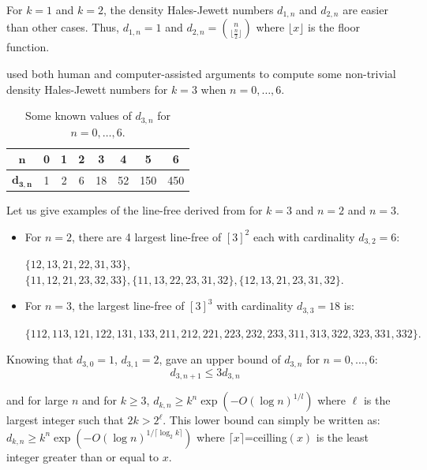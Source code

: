 For $k=1$ and $k=2$, the density Hales-Jewett numbers $d_{1,n}$ and $d_{2,n}$ are easier   than other cases.
Thus, $d_{1,n}=1$ and $d_{2,n}= {n \choose \lfloor \frac{n}{2} \rfloor}$ where $\lfloor x \rfloor $ is the floor function. 

\cite{polymath2010density} used both human and computer-assisted arguments to compute some non-trivial density Hales-Jewett numbers for $k=3$ when $n= 0,\ldots,6.$

\begin{table}[h]
\centering
\begin{tabular}{|c|c|c|c|c|c|c|c|}
\hline 
$\mathbf{n}$ & 0 & 1 & 2 & 3 & 4 & 5 & 6 \\ 
\hline 
$\mathbf{d_{3,n}}$ & 1 & 2 & 6 & 18 & 52 & 150 & 450 \\ 
\hline 
\end{tabular}
\caption{Some known values of $d_{3,n}$ for $ n= 0,\ldots,6.$}
\end{table} 

Let us give examples of the line-free derived from \cite{polymath2010density} for $k=3$ and $n=2$ and $n=3.$
\begin{itemize}
\item For $n=2$, there are 4 largest line-free of $[3]^2$ each with cardinality $d_{3,2}=6 :$ 

$ \{12, 13, 21, 22, 31, 33 \}$, $\{11, 12, 21, 23, 32, 33 \}, \{11, 13, 22, 23, 31, 32 \}, \{12, 13, 21, 23, 31, 32 \}.$
\item For $n=3$, the largest line-free of $[3]^3$ with cardinality $d_{3,3}=18$ is: 

$\{112, 113, 121, 122, 131, 133, 211, 212, 221, 223, 232, 233, 311, 313, 322, 323, 331, 332 \}.$
\end{itemize}

Knowing that $d_{3,0}=1$, $d_{3,1}=2$,  \cite{polymath2010density} gave an upper bound of $d_{3,n}$ for $n= 0,\ldots,6$: $$d_{3,n+1} \leq 3 d_{3,n}$$

and for large $n$ and for $k\geq 3$, $d_{k,n} \geq k^n \exp \left(-O(\log n)^{1/l}\right)$ where $\ell$ is the largest integer such that $2k > 2^{\ell}$. This lower bound can simply be written as: $d_{k,n} \geq k^n  \exp \left(-O(\log n)^{1/\lceil \log_2 k \rceil}\right)$ where $\lceil x \rceil$=ceilling$(x)$ is the least integer greater than or equal to $x.$ 

